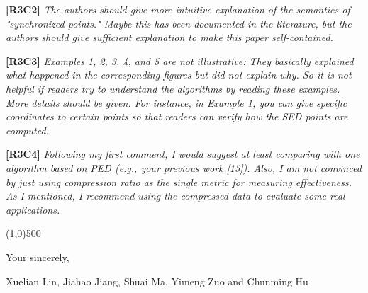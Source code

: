 \documentclass{letter}
\begin{document}
\textbf{[R3C2]} \emph{The authors should give more intuitive explanation of the semantics of "synchronized points." Maybe this has been documented in the literature, but the authors should give sufficient explanation to make this paper self-contained.}

\textbf{[R3C3]} \emph{Examples 1, 2, 3, 4, and 5 are not illustrative: They basically explained what happened in the corresponding figures but did not explain why. So it is not helpful if readers try to understand the algorithms by reading these examples. More details should be given. For instance, in Example 1, you can give specific coordinates to certain points so that readers can verify how the SED points are computed.}

\textbf{[R3C4]} \emph{Following my first comment, I would suggest at least comparing with one algorithm based on PED (e.g., your previous work [15]). Also, I am not convinced by just using compression ratio as the single metric for measuring effectiveness. As I mentioned, I recommend using the compressed data to evaluate some real applications.}


\line(1,0){500}

Your sincerely,

Xuelian Lin, Jiahao Jiang, Shuai Ma, Yimeng Zuo and Chunming Hu
\end{document}
